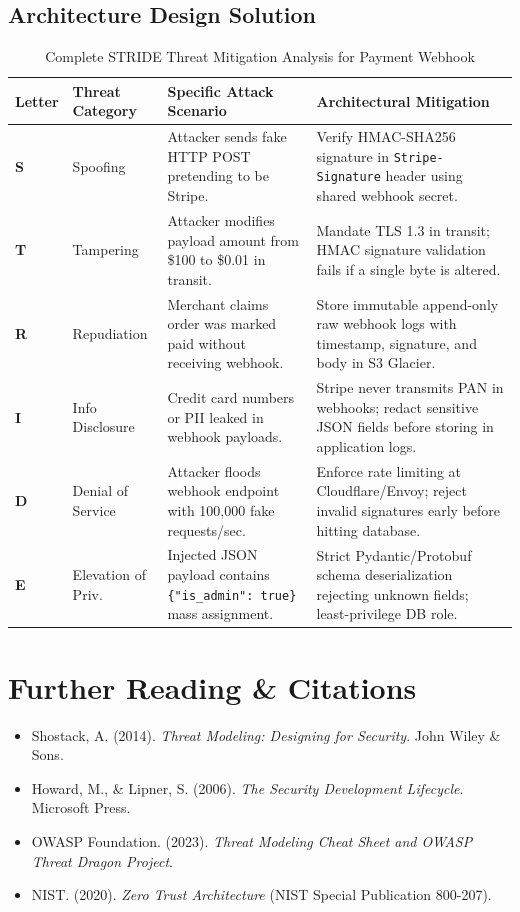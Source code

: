 \subsection*{Architecture Design Solution}
\begin{table}[htbp]
\centering\scriptsize
\begin{tabular}{llp{3.5cm}p{4.2cm}}
\toprule
\textbf{Letter} & \textbf{Threat Category} & \textbf{Specific Attack Scenario} & \textbf{Architectural Mitigation} \\
\midrule
\textbf{S} & Spoofing & Attacker sends fake HTTP POST pretending to be Stripe. & Verify HMAC-SHA256 signature in \texttt{Stripe-Signature} header using shared webhook secret. \\
\textbf{T} & Tampering & Attacker modifies payload amount from \$100 to \$0.01 in transit. & Mandate TLS 1.3 in transit; HMAC signature validation fails if a single byte is altered. \\
\textbf{R} & Repudiation & Merchant claims order was marked paid without receiving webhook. & Store immutable append-only raw webhook logs with timestamp, signature, and body in S3 Glacier. \\
\textbf{I} & Info Disclosure & Credit card numbers or PII leaked in webhook payloads. & Stripe never transmits PAN in webhooks; redact sensitive JSON fields before storing in application logs. \\
\textbf{D} & Denial of Service & Attacker floods webhook endpoint with 100,000 fake requests/sec. & Enforce rate limiting at Cloudflare/Envoy; reject invalid signatures early before hitting database. \\
\textbf{E} & Elevation of Priv. & Injected JSON payload contains \texttt{\{"is\_admin": true\}} mass assignment. & Strict Pydantic/Protobuf schema deserialization rejecting unknown fields; least-privilege DB role. \\
\bottomrule
\end{tabular}
\caption{Complete STRIDE Threat Mitigation Analysis for Payment Webhook}
\end{table}

\section{Further Reading \protect\& Citations}
\begin{itemize}[leftmargin=18pt]
  \item Shostack, A. (2014). \textit{Threat Modeling: Designing for Security}. John Wiley \& Sons.
  \item Howard, M., \& Lipner, S. (2006). \textit{The Security Development Lifecycle}. Microsoft Press.
  \item OWASP Foundation. (2023). \textit{Threat Modeling Cheat Sheet and OWASP Threat Dragon Project}.
  \item NIST. (2020). \textit{Zero Trust Architecture} (NIST Special Publication 800-207).
\end{itemize}
